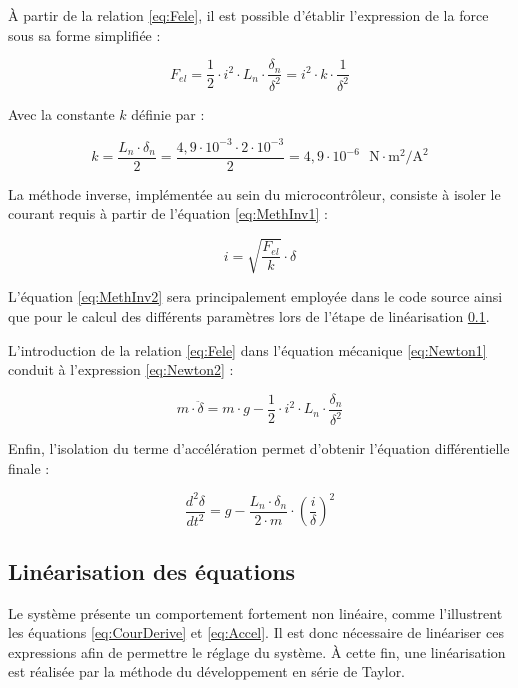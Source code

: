 À partir de la relation \ref{eq:Fele}, il est possible d'établir l'expression de la force sous sa forme simplifiée :

\begin{equation}
    F_{el} = \frac{1}{2} \cdot i^2 \cdot L_n \cdot \frac{\delta_n}{\delta^2} = i^2 \cdot k \cdot \frac{1}{\delta^2}
    \label{eq:MethInv1}
\end{equation}

Avec la constante $k$ définie par :

\begin{equation}
    k = \frac{L_n\cdot\delta_n}{2} = \frac{4,9\cdot 10^{-3}\cdot 2\cdot 10^{-3}}{2}=4,9\cdot 10^{-6} \text{ } \text{N}\cdot\text{m}^2/\text{A}^2
\end{equation}

La méthode inverse, implémentée au sein du microcontrôleur, consiste à isoler le courant requis à partir de l'équation \ref{eq:MethInv1} :

\begin{equation}
    i = \sqrt{\frac{F_{el}}{k}} \cdot \delta
    \label{eq:MethInv2}
\end{equation}

L'équation \ref{eq:MethInv2} sera principalement employée dans le code source ainsi que pour le calcul des différents paramètres lors de l'étape de linéarisation \ref{subsec:lin}.

L'introduction de la relation \ref{eq:Fele} dans l'équation mécanique \ref{eq:Newton1} conduit à l'expression \ref{eq:Newton2} :

\begin{equation}
    m \cdot \ddot{\delta} = m\cdot g - \frac{1}{2} \cdot i^2 \cdot L_n \cdot \frac{\delta_n}{\delta^2}
    \label{eq:Newton2}
\end{equation}

Enfin, l'isolation du terme d'accélération permet d'obtenir l'équation différentielle finale :

\begin{equation}
    \frac{d^2\delta}{dt^2} = g - \frac{L_n \cdot \delta_n}{2 \cdot m} \cdot \left(\frac{i}{\delta}\right)^2
    \label{eq:Accel}
\end{equation}

\subsection{Linéarisation des équations}
\label{subsec:lin}
Le système présente un comportement fortement non linéaire, comme l'illustrent les équations \ref{eq:CourDerive} et \ref{eq:Accel}. Il est donc nécessaire de linéariser ces expressions afin de permettre le réglage du système. À cette fin, une linéarisation est réalisée par la méthode du développement en série de Taylor.\\

